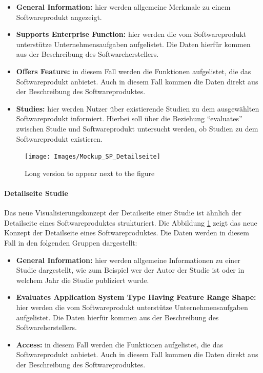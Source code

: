\begin{itemize}
\item \textbf{General Information:} hier werden allgemeine Merkmale zu einem Softwareprodukt angezeigt.
\item \textbf{Supports Enterprise Function:} hier werden die vom Softwareprodukt unterstütze Unternehmensaufgaben aufgelistet. Die Daten hierfür kommen aus der Beschreibung des Softwareherstellers.
\item \textbf{Offers Feature:} in diesem Fall werden die Funktionen aufgelistet, die das Softwareprodukt anbietet. Auch in diesem Fall kommen die Daten direkt aus der Beschreibung des Softwareproduktes.
\item \textbf{Studies:} hier werden Nutzer über existierende Studien zu dem ausgewählten Softwareprodukt informiert. Hierbei soll über die Beziehung \enquote{evaluates} zwischen Studie und Softwareprodukt untersucht werden, ob  Studien zu dem Softwareprodukt existieren.
\end{itemize}

\begin{figure}[H]
	\centering
    	\texttt{[image: Images/Mockup\_SP\_Detailseite]}
   	\caption[Mockup -- Detailseite Softwareprodukt]{Long version to appear next to the figure}
   	\label{fig:mockup_sp_detail}
\end{figure}

\paragraph{Detailseite Studie}

Das neue Visualisierungskonzept der Detailseite einer Studie ist ähnlich der Detailseite eines Softwareproduktes strukturiert.
Die Abbildung \ref{fig:mockup_sp_detail} zeigt das neue Konzept der Detailseite eines Softwareproduktes.
Die Daten werden in diesem Fall in den folgenden Gruppen dargestellt:

\begin{itemize}
\item \textbf{General Information:} hier werden allgemeine Informationen zu einer Studie dargestellt, wie zum Beispiel wer der Autor der Studie ist oder in welchem Jahr die Studie publiziert wurde.
\item \textbf{Evaluates Application System Type Having Feature Range Shape:} hier werden die vom Softwareprodukt unterstütze Unternehmensaufgaben aufgelistet. Die Daten hierfür kommen aus der Beschreibung des Softwareherstellers.
\item \textbf{Access:} in diesem Fall werden die Funktionen aufgelistet, die das Softwareprodukt anbietet. Auch in diesem Fall kommen die Daten direkt aus der Beschreibung des Softwareproduktes.
\end{itemize}

